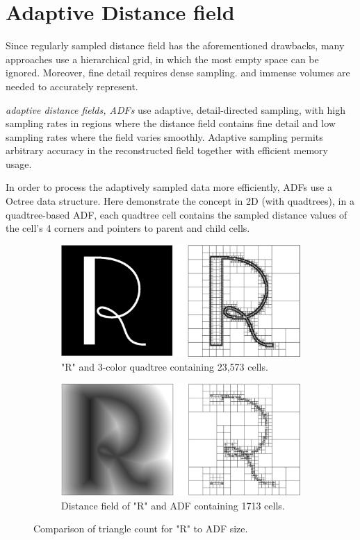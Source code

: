 \section{Adaptive Distance field}
Since regularly sampled distance field has the aforementioned drawbacks, many approaches use a hierarchical grid, in which the most empty space can be ignored. Moreover, fine detail requires dense sampling. and immense volumes are needed to accurately represent.

\textit{adaptive distance fields, ADFs}\cite{a:adf} use adaptive, detail-directed sampling, with high sampling rates in regions where the distance field contains fine detail and low sampling rates where the field varies smoothly. Adaptive sampling permits arbitrary accuracy in the reconstructed field together with efficient memory usage. 

In order to process the adaptively sampled data more efficiently, ADFs use a Octree data structure. Here demonstrate the concept in 2D (with quadtrees), in a quadtree-based ADF, each quadtree cell contains the sampled distance values of the cell's 4 corners and pointers to parent and child cells.
 
\begin{figure}
	\begin{subfigure}[b]{0.5\textwidth}
		\includegraphics{graphics/df/adf-1}
		\caption{"R" and 3-color quadtree containing 23,573 cells.}
	\end{subfigure}
	\begin{subfigure}[b]{0.5\textwidth}
		\includegraphics{graphics/df/adf-2}
		\caption{Distance field of "R" and ADF containing 1713 cells.}
	\end{subfigure}
	\caption{Comparison of triangle count for "R" to ADF size.}
	\label{f:adf}
\end{figure}

